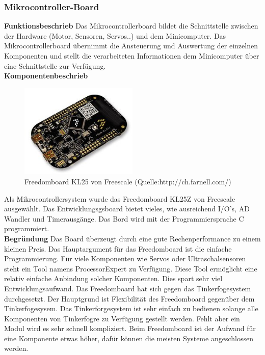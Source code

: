 \subsubsection{Mikrocontroller-Board}
\textbf{Funktionsbeschrieb}
Das Mikrocontrollerboard bildet die Schnittstelle zwischen der Hardware (Motor, Sensoren, Servos..) und dem Minicomputer. Das Mikrocontrollerboard übernimmt die Ansteuerung und Auswertung der einzelnen Komponenten und stellt die verarbeiteten Informationen dem Minicomputer über eine Schnittstelle zur Verfügung. \\[0.2cm]
\textbf{Komponentenbeschrieb}\\[0.2cm]
\begin{figure}[h]
	\centering
	\includegraphics[width=0.5\textwidth]{03_Loesungskonzept/pictures/freedomboard.png}
	\caption{Freedomboard KL25 von Freescale (Quelle:http://ch.farnell.com/)}
\end{figure}
Als Mikrocontrollersystem wurde das Freedomboard KL25Z von Freescale ausgewählt. Das Entwicklungsgsboard bietet vieles, wie ausreichend I/O's, AD Wandler und Timerausgänge. Das Bord wird mit der Programmiersprache C programmiert. \\[0.2cm]
\textbf{Begründung}
Das Board überzeugt durch eine gute Rechenperformance zu einem kleinen Preis. Das Hauptargument für das Freedomboard ist die einfache Programmierung. Für viele Komponenten wie Servos oder Ultraschalsensoren steht ein Tool namens ProcessorExpert zu Verfügung. Diese Tool ermöglicht eine relativ einfache Anbindung solcher Komponenten. Dies spart sehr viel Entwicklungsaufwand.
Das Freedomboard hat sich gegen das Tinkerfogesystem durchgesetzt. Der Hauptgrund ist Flexibilität des Freedomboard gegenüber dem Tinkerfogesysem. Das Tinkerforgesystem ist sehr einfach zu bedienen solange alle Komponenten von Tinkerfogre zu Verfügung gestellt werden. Fehlt aber ein Modul wird es sehr schnell kompliziert. Beim Freedomboard ist der Aufwand für eine Komponente etwas höher, dafür können die meisten Systeme angeschlossen werden.\\[0.2cm]
